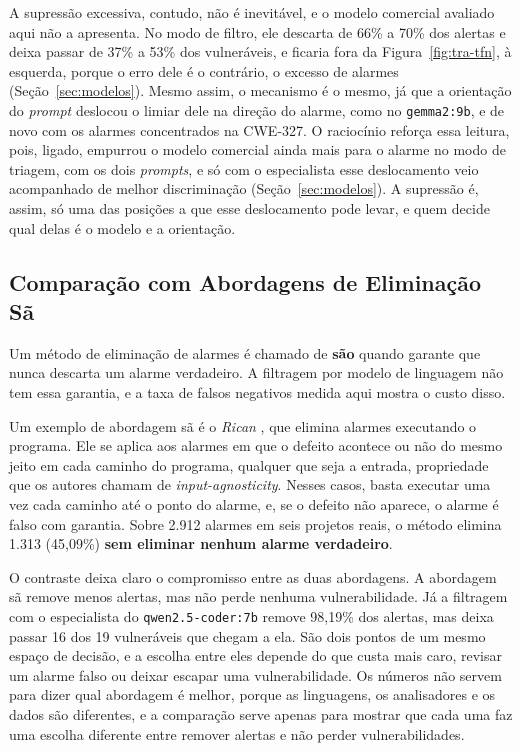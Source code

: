 A supressão excessiva, contudo, não é inevitável, e o modelo comercial avaliado aqui não a apresenta. No modo de filtro, ele descarta de 66\% a 70\% dos alertas e deixa passar de 37\% a 53\% dos vulneráveis, e ficaria fora da Figura~\ref{fig:tra-tfn}, à esquerda, porque o erro dele é o contrário, o excesso de alarmes (Seção~\ref{sec:modelos}). Mesmo assim, o mecanismo é o mesmo, já que a orientação do \textit{prompt} deslocou o limiar dele na direção do alarme, como no \texttt{gemma2:9b}, e de novo com os alarmes concentrados na CWE-327. O raciocínio reforça essa leitura, pois, ligado, empurrou o modelo comercial ainda mais para o alarme no modo de triagem, com os dois \textit{prompts}, e só com o especialista esse deslocamento veio acompanhado de melhor discriminação (Seção~\ref{sec:modelos}). A supressão é, assim, só uma das posições a que esse deslocamento pode levar, e quem decide qual delas é o modelo e a orientação.

\subsection{Comparação com Abordagens de Eliminação Sã}
\label{subsec:saeliminacao}

Um método de eliminação de alarmes é chamado de \textbf{são} quando garante que nunca descarta um alarme verdadeiro. A filtragem por modelo de linguagem não tem essa garantia, e a taxa de falsos negativos medida aqui mostra o custo disso.

Um exemplo de abordagem sã é o \textit{Rican} \cite{wang2026rican}, que elimina alarmes executando o programa. Ele se aplica aos alarmes em que o defeito acontece ou não do mesmo jeito em cada caminho do programa, qualquer que seja a entrada, propriedade que os autores chamam de \textit{input-agnosticity}. Nesses casos, basta executar uma vez cada caminho até o ponto do alarme, e, se o defeito não aparece, o alarme é falso com garantia. Sobre 2.912 alarmes em seis projetos reais, o método elimina 1.313 (45,09\%) \textbf{sem eliminar nenhum alarme verdadeiro}.

O contraste deixa claro o compromisso entre as duas abordagens. A abordagem sã remove menos alertas, mas não perde nenhuma vulnerabilidade. Já a filtragem com o especialista do \texttt{qwen2.5-coder:7b} remove 98,19\% dos alertas, mas deixa passar 16 dos 19 vulneráveis que chegam a ela. São dois pontos de um mesmo espaço de decisão, e a escolha entre eles depende do que custa mais caro, revisar um alarme falso ou deixar escapar uma vulnerabilidade. Os números não servem para dizer qual abordagem é melhor, porque as linguagens, os analisadores e os dados são diferentes, e a comparação serve apenas para mostrar que cada uma faz uma escolha diferente entre remover alertas e não perder vulnerabilidades.

